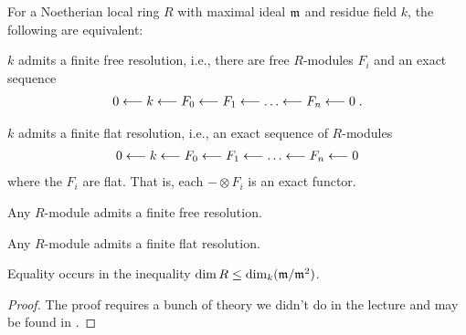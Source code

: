 \documentclass[a4paper,parskip=half,numbers=enddot, DIV=12]{scrreprt}
\begin{document}
\begin{thm}[Serre] 
    For a Noetherian local ring $R$ with maximal ideal $\mathfrak{m}$ and residue field $k$, the following are equivalent:
    \begin{alphanumerate}
    \item 
        $k$ admits a finite free resolution, i.e., there are free $R$-modules $F_i$ and an exact sequence
            \begin{align*}
                0 \lmorphism k \lmorphism F_0 \lmorphism F_1 \lmorphism \ldots \lmorphism F_n \lmorphism 0\;.
            \end{align*}
    \item 
        $k$ admits a finite flat resolution, i.e., an exact sequence of $R$-modules
            \begin{align*}
                0 \lmorphism k \lmorphism F_0 \lmorphism F_1 \lmorphism \ldots \lmorphism F_n \lmorphism 0
            \end{align*}
        where the $F_i$ are flat. That is, each $-\otimes F_i$ is an exact functor.
    \item 
        Any $R$-module admits a finite free resolution.
    \item 
        Any $R$-module admits a finite flat resolution.
    \item 
        Equality occurs in the inequality $\dim R \leq \dim_k (\mathfrak{m}/\mathfrak{m}^2)$.
    \end{alphanumerate}
\end{thm}
\begin{proof}
	The proof requires a bunch of theory we didn't do in the lecture and may be found in \cite[Theorem~1]{homalg}.
\end{proof}
\end{document}
